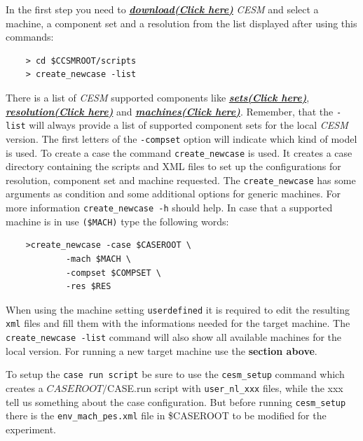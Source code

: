\documentclass[]{article}
\begin{document}
In the first step you need to
\href{http://www.cesm.ucar.edu/models/cesm1.2/cesm/doc/usersguide/x290.html}{\textbf{\textbf{\emph{download(Click
here)}}}} \emph{CESM} and select a machine, a component set and a
resolution from the list displayed after using this commands:

\begin{verbatim}
    > cd $CCSMROOT/scripts
    > create_newcase -list
\end{verbatim}

There is a list of \emph{CESM} supported components like
\href{http://www.cesm.ucar.edu/models/cesm1.2/cesm/doc/modelnl/compsets.html}{\textbf{\textbf{\emph{sets(Click
here)}}}},
\href{http://www.cesm.ucar.edu/models/cesm1.2/cesm/doc/modelnl/grid.html}{\textbf{\textbf{\emph{resolution(Click
here)}}}} and
\href{http://www.cesm.ucar.edu/models/cesm1.2/cesm/doc/modelnl/machines.html}{\textbf{\textbf{\emph{machines(Click
here)}}}}. Remember, that the \texttt{-list} will always provide a list
of supported component sets for the local \emph{CESM} version. The first
letters of the \texttt{-compset} option will indicate which kind of
model is used. To create a case the command \texttt{create\_newcase} is
used. It creates a case directory containing the scripts and XML files
to set up the configurations for resolution, component set and machine
requested. The \texttt{create\_newcase} has some arguments as condition
and some additional options for generic machines. For more information
\texttt{create\_newcase\ -h} should help. In case that a supported
machine is in use \texttt{(\$MACH)} type the following words:

\begin{verbatim}
    >create_newcase -case $CASEROOT \
            -mach $MACH \
            -compset $COMPSET \
            -res $RES
\end{verbatim}

When using the machine setting \texttt{userdefined} it is required to
edit the resulting \texttt{xml} files and fill them with the
informations needed for the target machine. The
\texttt{create\_newcase\ -list} command will also show all available
machines for the local version. For running a new target machine use the
\textbf{section above}.

To setup the \texttt{case\ run\ script} be sure to use the
\texttt{cesm\_setup} command which creates a \(CASEROOT/\)CASE.run
script with \texttt{user\_nl\_xxx} files, while the xxx tell us
something about the case configuration. But before running
\texttt{cesm\_setup} there is the \texttt{env\_mach\_pes.xml} file in
\$CASEROOT to be modified for the experiment.
\end{document}
